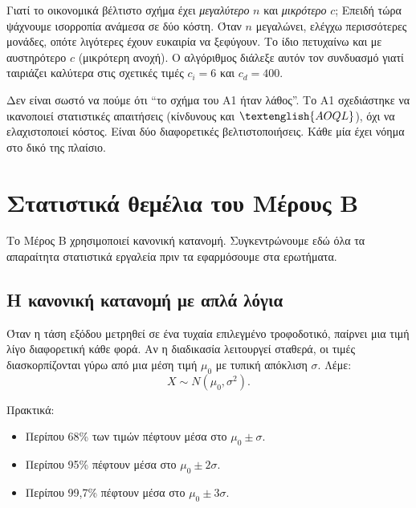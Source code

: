 \documentclass[12pt,a4paper]{article}
\newcommand{\AOQL}{\textenglish{AOQL}}
\begin{document}
\begin{intuition}
Γιατί το οικονομικά βέλτιστο σχήμα έχει \emph{μεγαλύτερο} \(n\) και
\emph{μικρότερο} \(c\); Επειδή τώρα ψάχνουμε ισορροπία ανάμεσα σε δύο
κόστη. Όταν \(n\) μεγαλώνει, ελέγχω περισσότερες μονάδες, οπότε λιγότερες
έχουν ευκαιρία να ξεφύγουν. Το ίδιο πετυχαίνω και με αυστηρότερο \(c\)
(μικρότερη ανοχή). Ο αλγόριθμος διάλεξε αυτόν τον συνδυασμό γιατί ταιριάζει
καλύτερα στις σχετικές τιμές \(c_i=6\) και \(c_d=400\).
\end{intuition}

\begin{trap}
Δεν είναι σωστό να πούμε ότι ``το σχήμα του Α1 ήταν λάθος''. Το Α1 σχεδιάστηκε
να ικανοποιεί στατιστικές απαιτήσεις (κίνδυνους και \(\AOQL\)), όχι να
ελαχιστοποιεί κόστος. Είναι δύο διαφορετικές βελτιστοποιήσεις. Κάθε μία έχει
νόημα στο δικό της πλαίσιο.
\end{trap}

\newpage

\section{Στατιστικά θεμέλια του Μέρους Β}

Το Μέρος Β χρησιμοποιεί κανονική κατανομή. Συγκεντρώνουμε εδώ όλα τα
απαραίτητα στατιστικά εργαλεία πριν τα εφαρμόσουμε στα ερωτήματα.

\subsection{Η κανονική κατανομή με απλά λόγια}

Όταν η τάση εξόδου μετρηθεί σε ένα τυχαία επιλεγμένο τροφοδοτικό, παίρνει
μια τιμή λίγο διαφορετική κάθε φορά. Αν η διαδικασία λειτουργεί σταθερά, οι
τιμές διασκορπίζονται γύρω από μια μέση τιμή \(\mu_0\) με τυπική απόκλιση
\(\sigma\). Λέμε:
\[
    X\sim N(\mu_0,\sigma^2).
\]

Πρακτικά:

\begin{itemize}[leftmargin=2.2em]
    \item Περίπου 68\% των τιμών πέφτουν μέσα στο \(\mu_0\pm \sigma\).
    \item Περίπου 95\% πέφτουν μέσα στο \(\mu_0\pm 2\sigma\).
    \item Περίπου 99,7\% πέφτουν μέσα στο \(\mu_0\pm 3\sigma\).
\end{itemize}
\end{document}
